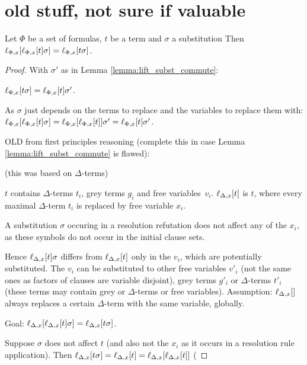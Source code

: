 \documentclass[,%
	paper=a4,%
	DIV14, 
	liststotoc,
	bibtotoc,
	draft=false,%
	numbers=noendperiod
]{scrartcl}
\begin{document}
\clearpage
\section{old stuff, not sure if valuable}

\begin{lemma}
  Let $\Phi$ be a set of formulas, $t$ be a term and $\sigma$ a substitution
  Then
  $\ell_{\Phi,x}[\ell_{\Phi,x}[t] \sigma] = \ell_{\Phi,x}[t\sigma]$.
  \label{lemma:lift_multiple_times}
\end{lemma}
\begin{proof}

  With $\sigma'$ as in Lemma \ref{lemma:lift_subst_commute}:

  $\ell_{\Phi,x}[t\sigma] = \ell_{\Phi,x}[t]\sigma'$.

  As $\sigma$ just depends on the terms to replace and the variables to replace them with:
  \newline
  $\ell_{\Phi,x}[\ell_{\Phi,x}[t]\sigma] = \ell_{\Phi,x}[\ell_{\Phi,x}[t]]\sigma' = \ell_{\Phi,x}[t]\sigma' $. \qedhere

  OLD from first principles reasoning (complete this in case Lemma \ref{lemma:lift_subst_commute}{} is flawed):

  {

    \tiny

    (this was based on $\Delta$-terms)

  $t$ contains $\Delta$-terms $t_i$, grey terms $g_i$ and free variables~$v_i$.
  $\ell_{\Delta,x}[t]$ is $t$, where every maximal $\Delta$-term $t_i$ is replaced by free variable $x_i$.

  A substitution $\sigma$ occuring in a resolution refutation does not affect any of the $x_i$, as these symbols do not occur   in the initial clause sets.

  Hence $\ell_{\Delta,x}[t] \sigma $ differs from $\ell_{\Delta,x}[t]$ only in the $v_i$, which are potentially substituted.
  The $v_i$ can be substituted to other free variables $v'_i$ (not the same ones as factors of clauses are variable disjoint),  grey terms $g'_i$ or $\Delta$-terms $t'_i$ (these terms may contain grey or $\Delta$-terms or free variables).
 Assumption: $\lifdelta$ always replaces a certain $\Delta$-term with the same variable, globally.

  Goal: $\ell_{\Delta,x}[\ell_{\Delta,x}[t] \sigma] = \ell_{\Delta,x}[t\sigma]$.

  Suppose $\sigma$ does not affect $t$ (and also not the $x_i$ as it occurs in a resolution rule application).
  Then $\ell_{\Delta,x}[t\sigma] = \ell_{\Delta,x}[t] = \ell_{\Delta,x}[\ell_{\Delta,x}[t]]$ (

}
\end{proof}
\end{document}
